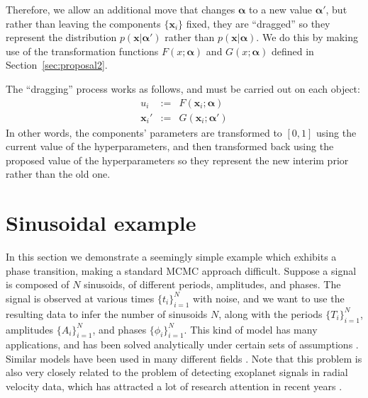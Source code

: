 \documentclass[letterpaper, 11pt]{article}
\newcommand{\hyperparams}{\boldsymbol{\alpha}}
\newcommand{\xx}{\mathbf{x}}
\begin{document}
Therefore, we allow an additional move that changes $\hyperparams$ to a new
value $\hyperparams'$, but rather than leaving the components $\{\xx_i\}$ fixed,
they are ``dragged''
so they represent the distribution $p(\xx | \hyperparams')$ rather than
$p(\xx|\hyperparams)$. We do this by making use of the transformation functions
$F(x; \hyperparams)$ and $G(x; \hyperparams)$ defined in
Section~\ref{sec:proposal2}.

The ``dragging'' process works as follows, and must be carried out on
each object:
\begin{eqnarray}
u_i &:=& F(\xx_i; \hyperparams)\\
\xx_i' &:=& G(\xx_i; \hyperparams')
\end{eqnarray}
In other words, the components' parameters are transformed to $[0,1]$ using the
current value of the hyperparameters, and then transformed back using the
proposed value of the hyperparameters so they represent the new interim prior
rather than the old one.

\section{Sinusoidal example}\label{sec:sinewaves}
In this section we demonstrate a seemingly simple example which exhibits
a phase transition, making a standard MCMC approach difficult. Suppose
a signal is composed of $N$ sinusoids, of different periods, amplitudes,
and phases. The signal is observed at various times $\{t_i\}_{i=1}^N$ with
noise, and we want to use the resulting data to infer the number of sinusoids
$N$, along with the periods $\{T_i\}_{i=1}^N$, amplitudes $\{A_i\}_{i=1}^N$,
and phases $\{\phi_i\}_{i=1}^N$.
This kind of model has many applications, and has been solved analytically
under certain sets of assumptions \citep[see e.g.][]{bretthorst, 2014arXiv1412.0467M}.
Similar
models have been used in many different fields
\citep[e.g.][]{2003AIPC..659....3B, 2005PhRvD..72b2001U, 2007ApJ...654..551B,
2009MNRAS.395.2226B}.
Note that this problem is also very closely related to the
problem of detecting exoplanet signals in radial velocity data, which has
attracted a lot of research attention in recent years
\citep[e.g.][]{gregory, fengji, 2011MNRAS.415.3462F}.
\end{document}
